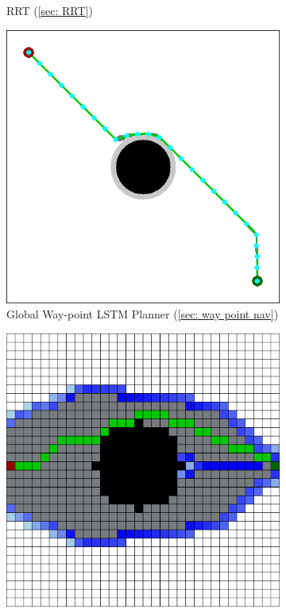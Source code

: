 \begin{figure}[h]
\begin{subfigure}[b]{0.2\linewidth}
    \caption{RRT (\ref{sec: RRT}) \newline}
  \end{subfigure}
  \hfill
  \begin{subfigure}[b]{0.2\linewidth}
    \includegraphics[width=\linewidth]{images/screenshot_51.png}
     \caption{Global Way-point LSTM Planner (\ref{sec: way point nav})}
  \end{subfigure}
  \hfill
  \begin{subfigure}[b]{0.2\linewidth}
    \includegraphics[width=\linewidth]{images/screenshot_50.png}

\end{subfigure}
\end{figure}
